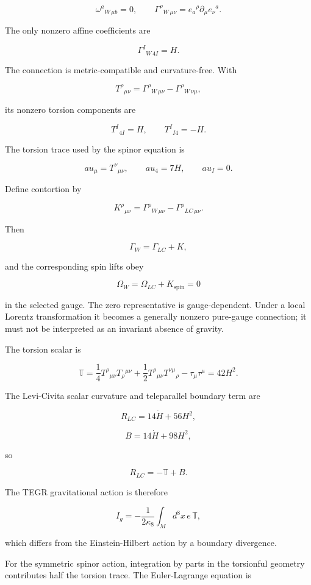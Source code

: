 \documentclass[11pt]{article}
\begin{document}
\[
\omega^a{}_{W\,\mu b}=0,
\qquad
\Gamma^\rho{}_{W\,\mu\nu}
=e_a{}^\rho\partial_\mu e_\nu{}^a.
\]

The only nonzero affine coefficients are

\[
\Gamma^I{}_{W\,4I}=H.
\]

The connection is metric-compatible and curvature-free. With

\[
T^\rho{}_{\mu\nu}
=\Gamma^\rho{}_{W\,\mu\nu}
-\Gamma^\rho{}_{W\,\nu\mu},
\]

its nonzero torsion components are

\[
T^I{}_{4I}=H,
\qquad
T^I{}_{I4}=-H.
\]

The torsion trace used by the spinor equation is

\[
	au_\mu=T^\nu{}_{\mu\nu},
\qquad
	au_4=7H,
\qquad
	au_I=0.
\]

Define contortion by

\[
K^\rho{}_{\mu\nu}
=\Gamma^\rho{}_{W\,\mu\nu}
-\Gamma^\rho{}_{LC\,\mu\nu}.
\]

Then

\[
\Gamma_W=\Gamma_{LC}+K,
\]

and the corresponding spin lifts obey

\[
\Omega_W=\Omega_{LC}+K_{\mathrm{spin}}=0
\]

in the selected gauge. The zero representative is gauge-dependent. Under a local Lorentz transformation it becomes a generally nonzero pure-gauge connection; it must not be interpreted as an invariant absence of gravity.

The torsion scalar is

\[
\mathbb T=
\frac14T^\rho{}_{\mu\nu}T_\rho{}^{\mu\nu}
+\frac12T^\rho{}_{\mu\nu}T^{\nu\mu}{}_\rho
-\tau_\mu\tau^\mu
=42H^2.
\]

The Levi-Civita scalar curvature and teleparallel boundary term are

\[
R_{LC}=14\dot H+56H^2,
\]

\[
B=14\dot H+98H^2,
\]

so

\[
\boxed{R_{LC}=-\mathbb T+B.}
\]

The TEGR gravitational action is therefore

\[
I_g=-\frac1{2\kappa_8}\int_Md^8x\,e\,\mathbb T,
\]

which differs from the Einstein-Hilbert action by a boundary divergence.

For the symmetric spinor action, integration by parts in the torsionful geometry contributes half the torsion trace. The Euler-Lagrange equation is
\end{document}
